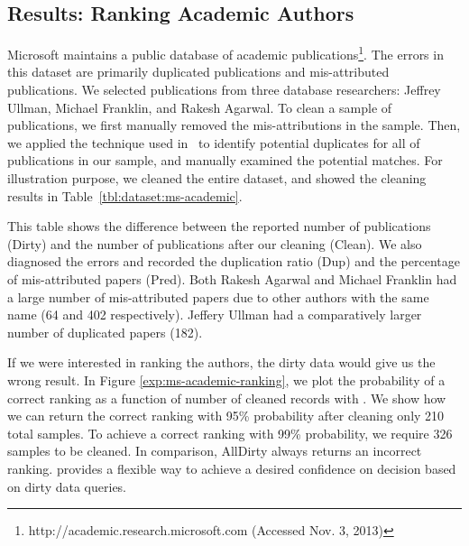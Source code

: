 \subsection{Results: Ranking Academic Authors}
Microsoft maintains a public database of academic publications\footnote{\scriptsize http://academic.research.microsoft.com (Accessed Nov. 3, 2013)}.
The errors in this dataset are primarily duplicated publications and mis-attributed publications.
We selected publications from three database researchers: Jeffrey Ullman, Michael Franklin, and Rakesh Agarwal.
To clean a sample of publications, we first manually removed the mis-attributions in the sample. Then, we applied the technique used in~\cite{wang2012crowder} to identify potential duplicates for all of publications in our sample, and manually examined the potential matches.  
For illustration purpose, we cleaned the entire dataset, and showed the cleaning results in Table~\ref{tbl:dataset:ms-academic}. 

This table shows the difference between the reported number of publications (Dirty) and the number of publications after our cleaning (Clean).
We also diagnosed the errors and recorded the duplication ratio (Dup) and the percentage of mis-attributed papers (Pred).
Both Rakesh Agarwal and Michael Franklin had a large number of mis-attributed papers due to other authors with the same name (64 and 402 respectively).
Jeffery Ullman had a comparatively larger number of duplicated papers (182).

If we were interested in ranking the authors, the dirty data would give us the wrong result. 
In Figure \ref{exp:ms-academic-ranking}, we plot the probability of a correct ranking as a function of number of cleaned records with \sampleclean.
We show how we can return the correct ranking with 95\% probability after cleaning only 210 total samples.
To achieve a correct ranking with 99\% probability, we require 326 samples to be cleaned.
In comparison, AllDirty always returns an incorrect ranking.
\sampleclean provides a flexible way to achieve a desired confidence on decision based on dirty data queries.

